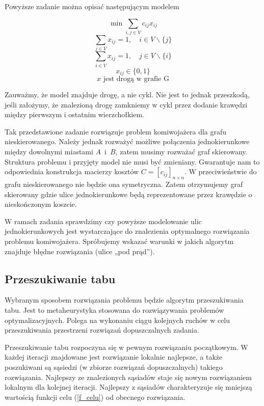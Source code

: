 \documentclass[11pt,a4paper,twoside]{article}
\begin{document}
Powyższe zadanie można opisać następującym modelem

\begin{equation}
\min \sum_{i,j \in V} c_{ij} x_{ij} 
\label{f_celu}
\end{equation}
\begin{equation}
\sum_{j \in V} x_{ij}=1, \quad i \in V \backslash \{j\} 
\end{equation}
\begin{equation}
\sum_{i \in V} x_{ij}=1, \quad j \in V \backslash \{i\} 
\end{equation}
\begin{equation}
x_{ij} \in \{0,1\}
\end{equation}
\begin{equation}
x \text{ jest drogą w grafie G}
\end{equation}

Zauważmy, że model znajduje drogę, a nie cykl. Nie jest to jednak przeszkodą, jeśli założymy, że znalezioną drogę zamkniemy w cykl przez dodanie krawędzi między pierwszym i ostatnim wierzchołkiem.

Tak przedstawione zadanie rozwiązuje problem komiwojażera dla grafu nieskierowanego. Należy jednak rozważyć możliwe połączenia jednokierunkowe między dowolnymi miastami \mbox{$A$ i $B$}, zatem musimy rozważać graf skierowany. Struktura problemu i przyjęty model nie musi być zmieniany. Gwarantuje nam to odpowiednia konstrukcja macierzy kosztów $C = [c_{ij}]_{n\times n}$. W przeciwieństwie do grafu nieskierowanego nie będzie ona symetryczna. Zatem otrzymujemy graf skierowany gdzie ulice jednokierunkowe będą reprezentowane przez krawędzie o nieskończonym koszcie. 

W ramach zadania sprawdzimy czy powyższe modelowanie ulic jednokierunkowych jest wystarczające do znalezienia optymalnego rozwiązania problemu komiwojażera. Spróbujemy wskazać warunki w jakich algorytm znajduje błędne rozwiązania (ulice „pod prąd”).

\subsection{Przeszukiwanie tabu}
Wybranym sposobem rozwiązania problemu będzie algorytm przeszukiwania tabu. Jest to metaheurystyka stosowana do rozwiązywania problemów optymalizacyjnych. Polega na  wykonaniu ciągu kolejnych ruchów w celu przeszukiwania przestrzeni rozwiązań dopuszczalnych zadania. 

Przeszukiwanie tabu rozpoczyna się w pewnym rozwiązaniu początkowym. W każdej iteracji znajdowane jest rozwiązanie lokalnie najlepsze, a także poszukiwani są sąsiedzi (w zbiorze rozwiązań dopuszczalnych) takiego rozwiązania. Najlepszy ze znalezionych sąsiadów staje się nowym rozwiązaniem lokalnym dla kolejnej iteracji. Najlepszy z sąsiadów charakteryzuje się mniejszą wartością funkcji celu (\ref{f_celu}) od obecnego rozwiązania.
\end{document}
